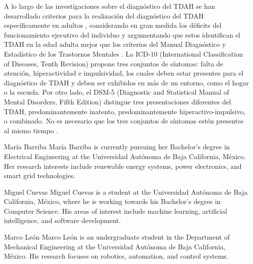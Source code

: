 \documentclass[10pt,journal,compsoc]{IEEEtran}
\begin{document}
A lo largo de las investigaciones sobre el diagnóstico del TDAH se han desarrollado criterios para la realización del diagnóstico del TDAH específicamente en adultos \cite{combs2015perceived}, considerando en gran medida los déficits del funcionamiento ejecutivo del individuo y argumentando que estos identifican el TDAH en la edad adulta mejor que los criterios del Manual Diagnóstico y Estadístico de los Trastornos Mentales \cite{american2000diagnostic}. La ICD-10 (International Classification of Diseases, Tenth Revision) propone tres conjuntos de síntomas: falta de atención, hiperactividad e impulsividad, los cuales deben estar presentes para el diagnóstico de TDAH y deben ser exhibidos en más de un entorno, como el hogar o la escuela. Por otro lado, el DSM-5 (Diagnostic and Statistical Manual of Mental Disorders, Fifth Edition) distingue tres presentaciones diferentes del TDAH, predominantemente inatento, predominantemente hiperactivo-impulsivo, o combinado. No es necesario que los tres conjuntos de síntomas estén presentes al mismo tiempo \cite{doernberg2016neurodevelopmental}.

\printbibliography

\begin{IEEEbiography}{María Barriba}
    María Barriba is currently pursuing her Bachelor's degree in Electrical Engineering at the Universidad Autónoma de Baja California, México. Her research interests include renewable energy systems, power electronics, and smart grid technologies.
\end{IEEEbiography}

\begin{IEEEbiography}{Miguel Cuevas}
    Miguel Cuevas is a student at the Universidad Autónoma de Baja California, México, where he is working towards his Bachelor's degree in Computer Science. His areas of interest include machine learning, artificial intelligence, and software development.
\end{IEEEbiography}

\begin{IEEEbiography}{Marco León}
    Marco León is an undergraduate student in the Department of Mechanical Engineering at the Universidad Autónoma de Baja California, México. His research focuses on robotics, automation, and control systems.
\end{IEEEbiography}
\end{document}
